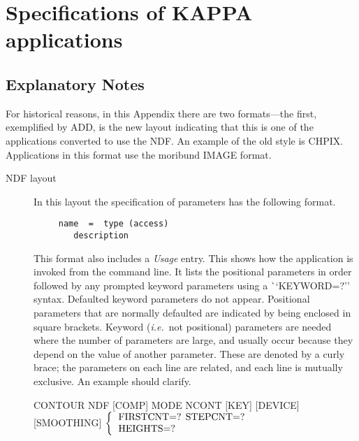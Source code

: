 {\newpage
\section{Specifications of KAPPA applications}
\label{ap:full}
\subsection{Explanatory Notes}
For historical reasons, in this Appendix there are two formats---the
first, exemplified by ADD, is the new layout indicating that this is
one of the applications converted to use the NDF. An example of the old
style is CHPIX. Applications in this format use the moribund IMAGE
format. 

\begin{description}
\item [NDF layout]
In this layout the specification of parameters has the following format. 

\begin{verbatim}
     name  =  type (access)
        description
\end{verbatim}
This format also includes a {\em Usage\/} entry.  This shows how the
application is invoked from the command line.   It lists the positional
parameters in order followed by any prompted keyword parameters using 
a {\mbox ``KEYWORD=?''} syntax.  Defaulted
keyword parameters do not appear.  Positional parameters
that are normally defaulted are indicated by being enclosed in square
brackets.   Keyword ({\it i.e.}\ not positional) parameters are needed 
where the number of parameters are large, and usually occur because
they depend on the value of another parameter.  These are denoted
by a curly brace; the parameters on each line are related, and 
each line is mutually exclusive.  An example should clarify.
\bigskip

{\ssttt \hspace*{1.0em}
        CONTOUR NDF [COMP] MODE NCONT [KEY] [DEVICE] [SMOOTHING]
        \newline\hspace*{2.5em}
        $\left\{ {\begin{tabular}{l}
                    FIRSTCNT=? STEPCNT=? \\
                    HEIGHTS=?
                   \end{tabular} }
        \right.$
        \newline\hspace*{2.9em}
}
\bigskip


\end{description}}
